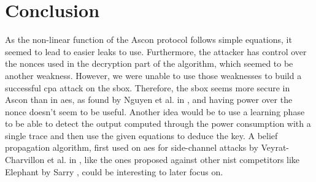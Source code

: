\documentclass[11pt,technote]{IEEEtran}
\begin{document}
		\section{Conclusion}
		As the non-linear function of the Ascon protocol follows simple equations, it seemed to lead to easier leaks to use. Furthermore, the attacker has control over the nonces used in the decryption part of the algorithm, which seemed to be another weakness. However, we were unable to use those weaknesses to build a successful \ac{cpa} attack on the \ac{sbox}. Therefore, the \ac{sbox} seems more secure in Ascon than in \ac{aes}, as found by Nguyen et al. in \cite{cpa_analysis}, and having power over the nonce doesn't seem to be useful. Another idea would be to use a learning phase to be able to detect the output computed through the power consumption with a single trace and then use the given equations \cite{these} to deduce the key. A belief propagation algorithm, first used on \ac{aes} for side-channel attacks by Veyrat-Charvillon et al. in \cite{bp_aes}, like the ones proposed against other \ac{nist} competitors like Elephant by Sarry \cite{these}, could be interesting to later focus on.
		
		\appendices
		
		 
		
				
		
		\section{}
		\printacronyms
		
\end{document}

